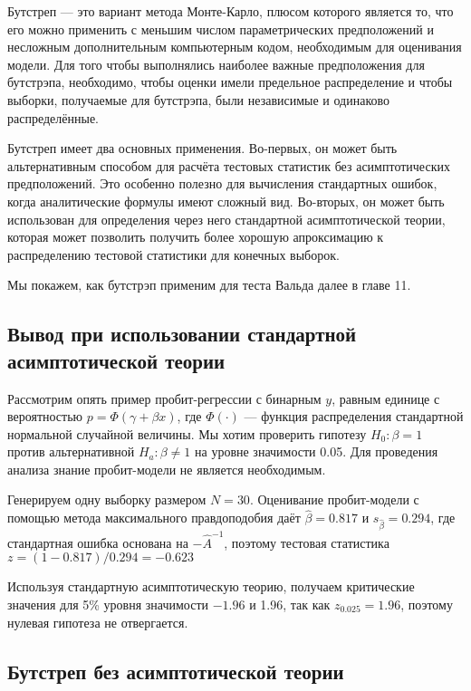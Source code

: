 Бутстреп --- это вариант метода Монте-Карло, плюсом которого является то, что его можно применить с меньшим числом параметрических предположений и несложным дополнительным компьютерным кодом, необходимым для оценивания модели. Для того чтобы выполнялись наиболее важные предположения для бутстрэпа, необходимо, чтобы оценки имели предельное распределение и чтобы выборки, получаемые для бутстрэпа, были независимые и одинаково распределённые.

Бутстреп имеет два основных применения. Во-первых, он может быть альтернативным способом для расчёта тестовых статистик без асимптотических предположений. Это особенно полезно для вычисления стандартных ошибок, когда аналитические формулы имеют сложный вид. Во-вторых, он может быть использован для определения через него стандартной асимптотической теории, которая может позволить получить более хорошую апроксимацию к распределению тестовой статистики для конечных выборок.

Мы покажем, как бутстрэп применим для теста Вальда далее в главе 11.
 
 
\subsection{Вывод при использовании стандартной асимптотической теории}

Рассмотрим опять пример пробит-регрессии с бинарным $y$, равным единице с вероятностью $p = \Phi (\gamma + \beta x)$, где $\Phi(\cdot)$ --- функция распределения стандартной нормальной случайной величины. Мы хотим проверить гипотезу $H_0: \beta = 1$ против альтернативной $H_a: \beta \not= 1$ на уровне значимости 0.05. Для проведения анализа знание пробит-модели не является необходимым.

Генерируем одну выборку размером $N = 30$. Оценивание пробит-модели с помощью метода максимального правдоподобия даёт $\hat{\beta} = 0.817$ и $s_{\hat{\beta}} = 0.294$, где стандартная ошибка основана на $- \hat{A}^{-1}$, поэтому тестовая статистика $z = (1 - 0.817)/0.294 = - 0.623$

Используя стандартную асимптотическую теорию, получаем критические значения для 5\% уровня значимости $- 1.96$ и 1.96, так как $z_{0.025} = 1.96$, поэтому нулевая гипотеза не отвергается.


\subsection{Бутстреп без асимптотической теории}

